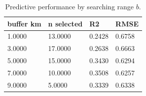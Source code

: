\begin{table}[t]\centering
\caption{Predictive performance by searching range $b$.}\label{tab:buffer}
\begin{tabular}{llll}
\hline
buffer km & n selected & R2 & RMSE \\
\hline
1.0000 & 13.0000 & 0.2428 & 0.6758 \\
3.0000 & 17.0000 & 0.2638 & 0.6663 \\
5.0000 & 15.0000 & 0.3430 & 0.6294 \\
7.0000 & 10.0000 & 0.3508 & 0.6257 \\
9.0000 & 5.0000 & 0.3339 & 0.6338 \\
\hline
\end{tabular}\end{table}
